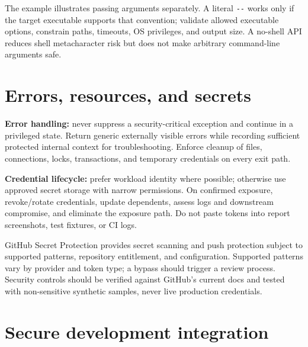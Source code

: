 \documentclass[
  letterpaper,
]{article}
\begin{document}
The example illustrates passing arguments separately. A literal
\texttt{-\/-} works only if the target executable supports that
convention; validate allowed executable options, constrain paths,
timeouts, OS privileges, and output size. A no-shell API reduces shell
metacharacter risk but does not make arbitrary command-line arguments
safe.

\section{Errors, resources, and
secrets}\label{errors-resources-and-secrets}

\textbf{Error handling:} never suppress a security-critical exception
and continue in a privileged state. Return generic externally visible
errors while recording sufficient protected internal context for
troubleshooting. Enforce cleanup of files, connections, locks,
transactions, and temporary credentials on every exit path.

\textbf{Credential lifecycle:} prefer workload identity where possible;
otherwise use approved secret storage with narrow permissions. On
confirmed exposure, revoke/rotate credentials, update dependents, assess
logs and downstream compromise, and eliminate the exposure path. Do not
paste tokens into report screenshots, test fixtures, or CI logs.

\begin{modernextension}
GitHub Secret Protection provides secret scanning and push protection subject to supported patterns, repository entitlement, and configuration. Supported patterns vary by provider and token type; a bypass should trigger a review process. Security controls should be verified against GitHub's current docs and tested with non-sensitive synthetic samples, never live production credentials.
\end{modernextension}

\section{Secure development
integration}\label{secure-development-integration}
\end{document}
